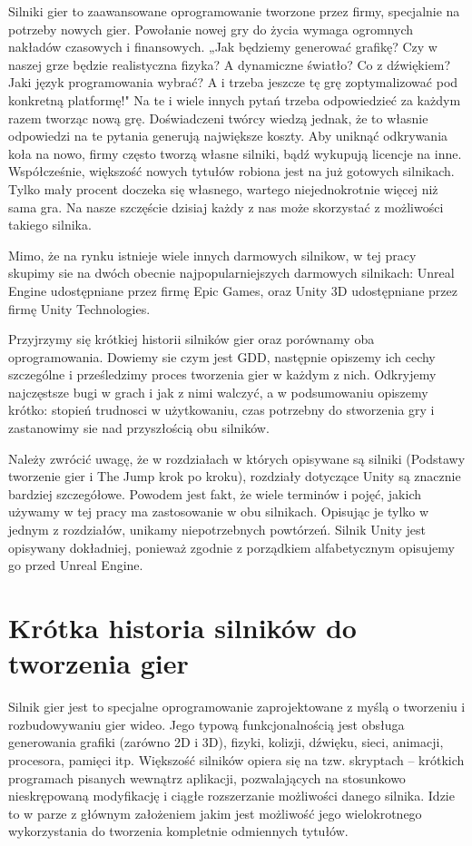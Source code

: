 \documentclass[12pt]{xmgr}
\begin{document}
Silniki gier to zaawansowane oprogramowanie tworzone przez firmy, specjalnie na potrzeby nowych gier. Powołanie nowej gry do życia wymaga ogromnych nakładów czasowych i finansowych. „Jak będziemy generować grafikę? Czy w naszej grze będzie realistyczna fizyka? A dynamiczne światło? Co z dźwiękiem? Jaki język programowania wybrać? A i trzeba jeszcze tę grę zoptymalizować pod konkretną platformę!" Na te i wiele innych pytań trzeba odpowiedzieć za każdym razem tworząc nową grę. Doświadczeni twórcy wiedzą jednak, że to własnie odpowiedzi na te pytania generują największe koszty. Aby uniknąć odkrywania koła na nowo, firmy często tworzą własne silniki, bądź wykupują licencje na inne. Współcześnie, większość nowych tytułów robiona jest na już gotowych silnikach. Tylko mały procent doczeka się własnego, wartego niejednokrotnie więcej niż sama gra. Na nasze szczęście dzisiaj każdy z nas może skorzystać z możliwości takiego silnika.

Mimo, że na rynku istnieje wiele innych darmowych silnikow, w tej pracy skupimy sie na dwóch obecnie najpopularniejszych darmowych silnikach:
Unreal Engine udostępniane przez firmę Epic Games, oraz Unity 3D udostępniane przez firmę Unity Technologies.

Przyjrzymy się krótkiej historii silników gier oraz porównamy oba oprogramowania. Dowiemy sie czym jest GDD, następnie opiszemy ich cechy szczególne i prześledzimy  proces tworzenia gier w każdym z nich. Odkryjemy najczęstsze bugi w grach i jak z nimi walczyć, a w podsumowaniu opiszemy krótko: stopień trudnosci w użytkowaniu, czas potrzebny do stworzenia gry i zastanowimy sie nad przyszłością obu silników.

Należy zwrócić uwagę, że w rozdziałach w których opisywane są silniki (Podstawy tworzenie gier i The Jump krok po kroku), rozdziały dotyczące Unity są znacznie bardziej szczegółowe. Powodem jest fakt, że wiele terminów i pojęć, jakich używamy w tej pracy ma zastosowanie w obu silnikach. Opisując je tylko w jednym z rozdziałów, unikamy niepotrzebnych powtórzeń. Silnik Unity jest opisywany dokładniej, ponieważ zgodnie z porządkiem alfabetycznym opisujemy go przed Unreal Engine.

\chapter{Krótka historia silników do tworzenia gier}

Silnik gier jest to specjalne oprogramowanie zaprojektowane z myślą o tworzeniu i rozbudowywaniu gier wideo. Jego typową funkcjonalnością jest obsługa generowania grafiki (zarówno 2D i 3D), fizyki, kolizji, dźwięku, sieci, animacji, procesora, pamięci itp. Większość silników opiera się na tzw. skryptach – krótkich programach pisanych wewnątrz aplikacji, pozwalających na stosunkowo nieskrępowaną modyfikację i ciągłe rozszerzanie możliwości danego silnika. Idzie to w parze z głównym założeniem jakim jest możliwość jego wielokrotnego wykorzystania do tworzenia kompletnie odmiennych tytułów.
\end{document}
